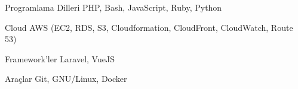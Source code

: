 
\begin{cvskills}
  \cvskill
    {Programlama Dilleri} %
    {PHP, Bash, JavaScript, Ruby, Python} %

  \cvskill
    {Cloud} %
    {AWS (EC2, RDS, S3, Cloudformation, CloudFront, CloudWatch, Route 53)} %

  \cvskill
    {Framework'ler} %
    {Laravel, VueJS} %

  \cvskill
    {Araçlar} %
    {Git, GNU/Linux, Docker} %
\end{cvskills}
